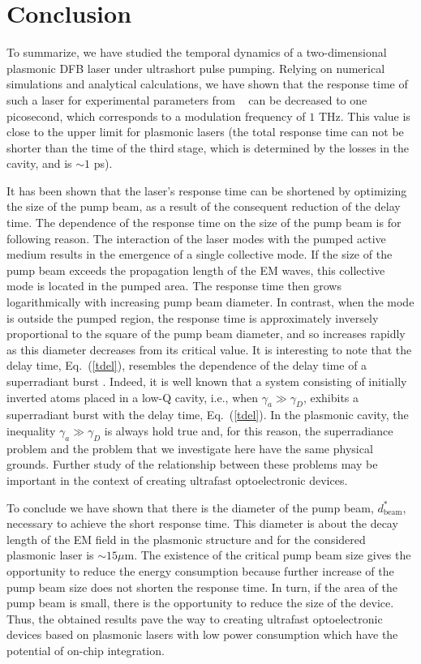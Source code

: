\documentclass[aps,prapplied,amsmath,amssymb,onecolumn,superscriptaddress,showpacs,floatfix,longbibliography]{revtex4-1}
\begin{document}
\section*{Conclusion}

To summarize, we have studied the temporal dynamics of a two-dimensional plasmonic DFB laser under ultrashort pulse pumping.
Relying on numerical simulations and analytical calculations, we have shown that the response time of such a laser for experimental parameters from ~\cite{TennerJOpt,TennerACSPhot} can be decreased to one picosecond, which corresponds to a modulation frequency of $1$ THz.
This value is close to the upper limit for plasmonic lasers (the total response time can not be shorter than the time of the third stage, which is determined by the losses in the cavity, and is $ \sim 1$ ps).

It has been shown that the laser's response time can be shortened by optimizing the size of the pump beam, as a result of the consequent reduction of the delay time.
The dependence of the response time on the size of the pump beam is for following reason.
The interaction of the laser modes with the pumped active medium results in the emergence of a single collective mode.
If the size of the pump beam exceeds the propagation length of the EM waves, this collective mode is located in the pumped area.
The response time then grows logarithmically with increasing pump beam diameter.
In contrast, when the mode is outside the pumped region, the response time is approximately inversely proportional to the square of the pump beam diameter, and so increases rapidly as this diameter decreases from its critical value.
It is interesting to note that the delay time, Eq.~(\ref{tdel}), resembles the dependence of the delay time of a superradiant burst \cite{gross1982superradiance, andreev1980collective,nefedkin2017badcavitySR}.
Indeed, it is well known \cite{gross1982superradiance, andreev1980collective} that a system consisting of initially inverted atoms placed in a low-Q cavity, i.e., when $\gamma_a \gg \gamma_D$, exhibits a superradiant burst with the delay time, Eq.~(\ref{tdel}). In the plasmonic cavity, the inequality $\gamma_a \gg \gamma_D$ is always hold true and, for this reason, the superradiance problem and the problem that we investigate here have the same physical grounds. Further study of the relationship between these problems may be important in the context of creating ultrafast optoelectronic devices.

To conclude we have shown that there is the diameter of the pump beam, $d_{\text{beam}}^*$, necessary to achieve the short response time. This diameter is about the decay length of the EM field in the plasmonic structure and for the considered plasmonic laser is $\sim 15 \mu$m. The existence of the critical pump beam size gives the opportunity to reduce the energy consumption because further increase of the pump beam size does not shorten the response time.
In turn, if the area of the pump beam is small, there is the opportunity to reduce the size of the device.
Thus, the obtained results pave the way to creating ultrafast optoelectronic devices based on plasmonic lasers with low power consumption which have the potential of on-chip integration.
\end{document}
